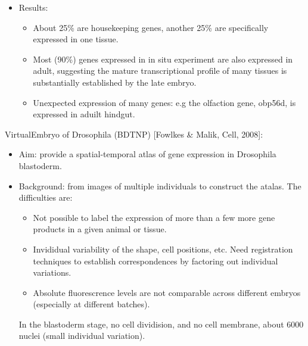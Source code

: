\documentclass{report}
\begin{document}
\begin{enumerate}
\begin{itemize}
		\item Results: 
		\begin{itemize}
			\item About 25\% are housekeeping genes, another 25\% are specifically expressed in one tissue. 
			\item Most (90\%) genes expressed in in situ experiment are also expressed in adult, suggesting the mature transcriptional profile of many tissues is substantially established by the late embryo. 
			\item Unexpected expression of many genes: e.g the olfaction gene, obp56d, is expressed in aduilt hindgut. 
		\end{itemize}
	\end{itemize}
	
	VirtualEmbryo of Drosophila (BDTNP) [Fowlkes \& Malik, Cell, 2008]:
	\begin{itemize}
		\item Aim: provide a spatial-temporal atlas of gene expression in Drosophila blastoderm. 
		
		\item Background: from images of multiple individuals to construct the atalas. The difficulties are: 
		\begin{itemize}
			\item Not possible to label the expression of more than a few more gene products in a given animal or tissue. 
			\item Invididual variability of the shape, cell positions, etc. Need registration techniques to establish correspondences by factoring out individual variations.
			\item Absolute fluorescrence levels are not comparable across different embryos (especially at different batches). 
		\end{itemize}
		In the blastoderm stage, no cell dividision, and no cell membrane, about 6000 nuclei (small individual variation). 
		

\end{itemize}
\end{enumerate}
\end{document}
